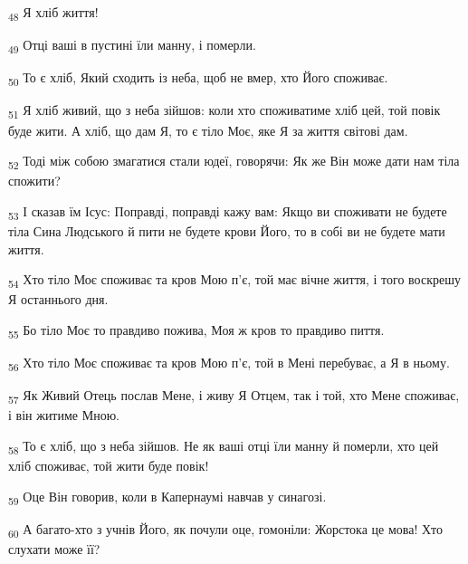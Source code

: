 \begin{tcolorbox}
\textsubscript{48} Я хліб життя!
\end{tcolorbox}
\begin{tcolorbox}
\textsubscript{49} Отці ваші в пустині їли манну, і померли.
\end{tcolorbox}
\begin{tcolorbox}
\textsubscript{50} То є хліб, Який сходить із неба, щоб не вмер, хто Його споживає.
\end{tcolorbox}
\begin{tcolorbox}
\textsubscript{51} Я хліб живий, що з неба зійшов: коли хто споживатиме хліб цей, той повік буде жити. А хліб, що дам Я, то є тіло Моє, яке Я за життя світові дам.
\end{tcolorbox}
\begin{tcolorbox}
\textsubscript{52} Тоді між собою змагатися стали юдеї, говорячи: Як же Він може дати нам тіла спожити?
\end{tcolorbox}
\begin{tcolorbox}
\textsubscript{53} І сказав їм Ісус: Поправді, поправді кажу вам: Якщо ви споживати не будете тіла Сина Людського й пити не будете крови Його, то в собі ви не будете мати життя.
\end{tcolorbox}
\begin{tcolorbox}
\textsubscript{54} Хто тіло Моє споживає та кров Мою п'є, той має вічне життя, і того воскрешу Я останнього дня.
\end{tcolorbox}
\begin{tcolorbox}
\textsubscript{55} Бо тіло Моє то правдиво пожива, Моя ж кров то правдиво пиття.
\end{tcolorbox}
\begin{tcolorbox}
\textsubscript{56} Хто тіло Моє споживає та кров Мою п'є, той в Мені перебуває, а Я в ньому.
\end{tcolorbox}
\begin{tcolorbox}
\textsubscript{57} Як Живий Отець послав Мене, і живу Я Отцем, так і той, хто Мене споживає, і він житиме Мною.
\end{tcolorbox}
\begin{tcolorbox}
\textsubscript{58} То є хліб, що з неба зійшов. Не як ваші отці їли манну й померли, хто цей хліб споживає, той жити буде повік!
\end{tcolorbox}
\begin{tcolorbox}
\textsubscript{59} Оце Він говорив, коли в Капернаумі навчав у синагозі.
\end{tcolorbox}
\begin{tcolorbox}
\textsubscript{60} А багато-хто з учнів Його, як почули оце, гомоніли: Жорстока це мова! Хто слухати може її?
\end{tcolorbox}
